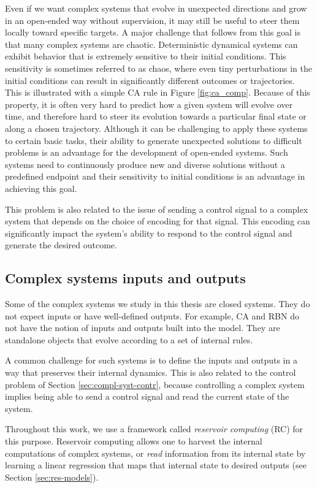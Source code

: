 Even if we want complex systems that evolve in unexpected directions and grow in
an open-ended way without supervision, it may still be useful to steer them
locally toward specific targets. A major challenge that follows from this goal
is that many complex systems are chaotic. Deterministic dynamical systems can 
exhibit behavior that is extremely sensitive to their initial conditions. This sensitivity 
is sometimes referred to as chaos, where even tiny perturbations in the initial conditions 
can result in significantly different outcomes or trajectories. This is illustrated 
with a simple \ac{CA} rule in Figure \ref{fig:ca_comp}. 
Because of this property, it is often very hard to predict how a
given system will evolve over time, and therefore hard to steer its evolution
towards a particular final state or along a chosen trajectory. Although it can be challenging 
to apply these systems to certain basic tasks, their ability to generate unexpected solutions 
to difficult problems is an advantage for the development of open-ended systems. Such systems 
need to continuously produce new and diverse solutions without a 
predefined endpoint and their sensitivity to initial conditions is an advantage in 
achieving this goal.

This problem is also related to the issue of sending a control signal to a
complex system that depends on the choice of encoding for that signal. This
encoding can significantly impact the system's ability to respond to the control 
signal and generate the desired outcome. 

\subsection{Complex systems inputs and outputs\label{sec:compl-syst-inputs}}

Some of the complex systems we study in this thesis are closed systems. They do
not expect inputs or have well-defined outputs. For example, \ac{CA} and
\ac{RBN} do not have the notion of inputs and outputs built into the model. They
are standalone objects that evolve according to a set of internal rules.

A common challenge for such systems is to define the inputs and outputs in a way
that preserves their internal dynamics. This is also related to the control
problem of Section \ref{sec:compl-syst-contr}, because controlling a complex
system implies being able to send a control signal and read the current
state of the system.

Throughout this work, we use a framework called \emph{reservoir computing} (RC) for this 
purpose. Reservoir
computing allows one to harvest the internal computations of complex systems, or
\emph{read} information from its internal state by learning a linear regression
that maps that internal state to desired outputs (see Section
\ref{sec:res-models}).



